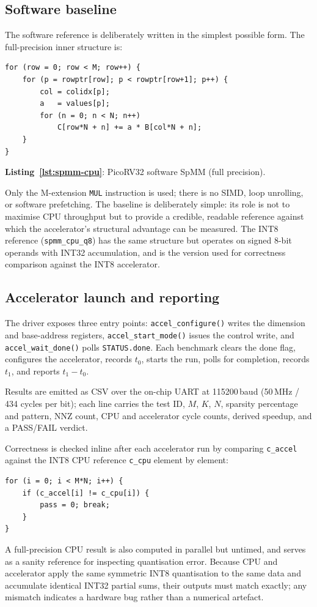 \subsection{Software baseline}

The software reference is deliberately written in the simplest
possible form. The full-precision inner structure is:
\begin{verbatim}
for (row = 0; row < M; row++) {
    for (p = rowptr[row]; p < rowptr[row+1]; p++) {
        col = colidx[p];
        a   = values[p];
        for (n = 0; n < N; n++)
            C[row*N + n] += a * B[col*N + n];
    }
}
\end{verbatim}
\noindent\textbf{Listing~\ref{lst:spmm-cpu}}: PicoRV32 software SpMM
(full precision).
\label{lst:spmm-cpu}

Only the M-extension \texttt{MUL} instruction is used; there is no
SIMD, loop unrolling, or software prefetching. The baseline is
deliberately simple: its role is not to maximise CPU throughput but to
provide a credible, readable reference against which the accelerator's
structural advantage can be measured. The INT8 reference
(\texttt{spmm\_cpu\_q8}) has the same structure but operates on signed
8-bit operands with INT32 accumulation, and is the version used for
correctness comparison against the INT8 accelerator.

\subsection{Accelerator launch and reporting}

The driver exposes three entry points: \texttt{accel\_configure()}
writes the dimension and base-address registers,
\texttt{accel\_start\_mode()} issues the control write, and
\texttt{accel\_wait\_done()} polls \texttt{STATUS.done}. Each benchmark
clears the done flag, configures the accelerator, records $t_0$, starts
the run, polls for completion, records $t_1$, and reports $t_1 - t_0$.

Results are emitted as CSV over the on-chip UART at 115200\,baud
(50\,MHz / 434 cycles per bit); each line carries the test ID, $M$,
$K$, $N$, sparsity percentage and pattern, NNZ count, CPU and
accelerator cycle counts, derived speedup, and a PASS/FAIL verdict.

Correctness is checked inline after each accelerator run by comparing
\texttt{c\_accel} against the INT8 CPU reference \texttt{c\_cpu}
element by element:
\begin{verbatim}
for (i = 0; i < M*N; i++) {
    if (c_accel[i] != c_cpu[i]) {
        pass = 0; break;
    }
}
\end{verbatim}
A full-precision CPU result is also computed in parallel but untimed,
and serves as a sanity reference for inspecting quantisation error.
Because CPU and accelerator apply the same symmetric INT8 quantisation
to the same data and accumulate identical INT32 partial sums, their
outputs must match exactly; any mismatch indicates a hardware bug
rather than a numerical artefact.


